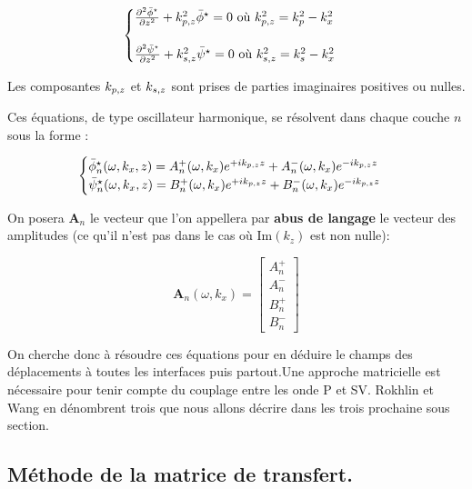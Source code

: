 \begin{equation}
    \begin{cases}
         \pderive[2]{\bar{\phi}^\star}{z} + k_{p,z}^2\bar{\phi}^\star = 0 \text{  où  } k_{p,z}^2 = k_p^2-k_x^2 \\ \\
         \pderive[2]{\bar{\psi}^\star}{z} +  k_{s,z}^2\bar{\psi}^\star =0 \text{  où  } k_{s,z}^2 = k_s^2-k_x^2
    \end{cases}
\end{equation}

Les composantes $k_{p,z}$ et $k_{s,z}$ sont prises de parties imaginaires positives ou nulles.

Ces équations, de type oscillateur harmonique, se résolvent dans chaque couche $n$ sous la forme :

\begin{equation*}
    \begin{cases}
         \bar{\phi}^\star_n(\omega,k_x,z) = A_n^+(\omega,k_x) e^{+ik_{p,z} z} + A_n^-(\omega,k_x) e^{-ik_{p,z} z} \\ 
         \bar{\psi}^\star_n(\omega,k_x,z) = B_n^+(\omega,k_x) e^{+ik_{p,z} z} + B_n^-(\omega,k_x) e^{-ik_{p,z} z} \\ 
    \end{cases}
\end{equation*}

On posera $\bm{A}_n$ le vecteur que l'on appellera par \textbf{abus de langage }le vecteur des amplitudes (ce qu'il n'est pas dans le cas où Im$(k_z)$ est non nulle):

$$ \bm{A}_n(\omega,k_x) =  \begin{bmatrix} A_n^+ \\ A_n^- \\ B_n^+ \\ B_n^-  \end{bmatrix} $$


On cherche donc à résoudre ces équations pour en déduire le champs des déplacements à toutes les interfaces puis partout.Une approche matricielle est nécessaire pour tenir compte du couplage entre les onde P et SV.  Rokhlin et Wang \cite{Rokhlin_Wang} en dénombrent trois que nous allons décrire dans les trois prochaine sous section.



\subsection{Méthode de la matrice de transfert.}

